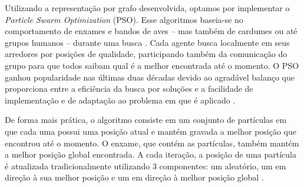 Utilizando a representação por grafo desenvolvida, optamos por implementar o \textit{Particle Swarm Optimization} (PSO). Esse algoritmos baseia-se no comportamento de enxames e bandos de aves -- mas também de cardumes ou até grupos humanos -- durante uma busca \cite[p.~7]{yang_nature-inspired_2010}. Cada agente busca localmente em seus arredores por posições de qualidade, participando também da comunicação do grupo para que todos saibam qual é a melhor encontrada até o momento. O PSO ganhou popularidade nas últimas duas décadas devido ao agradável balanço que proporciona entre a eficiência da busca por soluções e a facilidade de implementação e de adaptação ao problema em que é aplicado \cite[p.~640]{marti_handbook_2018}.

De forma mais prática, o algoritmo consiste em um conjunto de partículas em que cada uma possui uma posição atual e mantém gravada a melhor posição que encontrou até o momento. O enxame, que contém as partículas, também mantém a melhor posição global encontrada. A cada iteração, a posição de uma partícula é atualizada tradicionalmente utilizando 3 componentes: um aleatório, um em direção à sua melhor posição e um em direção à melhor posição global \cite[p.~642]{marti_handbook_2018}.
